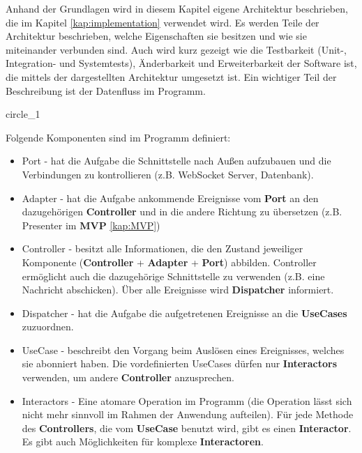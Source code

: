 Anhand der Grundlagen wird in diesem Kapitel eigene Architektur beschrieben, die im Kapitel \ref{kap:implementation} verwendet wird.
Es werden Teile der Architektur beschrieben, welche Eigenschaften sie besitzen und wie sie miteinander verbunden sind.
Auch wird kurz gezeigt wie die Testbarkeit (Unit-, Integration- und Systemtests), 
Änderbarkeit und Erweiterbarkeit der Software ist, die mittels der dargestellten Architektur umgesetzt ist.    
Ein wichtiger Teil der Beschreibung ist der Datenfluss im Programm.

{circle_1}

Folgende Komponenten sind im Programm definiert:
\begin{itemize}
    \item Port - hat die Aufgabe die Schnittstelle nach Außen aufzubauen und die Verbindungen zu kontrollieren (z.B. WebSocket Server, Datenbank).
    \item Adapter  - hat die Aufgabe ankommende Ereignisse vom \textbf{Port} an den dazugehörigen \textbf{Controller} 
    und in die andere Richtung zu übersetzen (z.B. Presenter im \textbf{MVP} \ref{kap:MVP})
    \item Controller - besitzt alle Informationen, die den Zustand jeweiliger Komponente (\textbf{Controller} + \textbf{Adapter} + \textbf{Port}) abbilden.
    Controller ermöglicht auch die dazugehörige Schnittstelle zu verwenden (z.B. eine Nachricht abschicken).
    Über alle Ereignisse wird \textbf{Dispatcher} informiert.
    \item Dispatcher - hat die Aufgabe die aufgetretenen Ereignisse an die \textbf{UseCases} zuzuordnen.
    \item UseCase - beschreibt den Vorgang beim Auslösen eines Ereignisses, welches sie abonniert haben. Die
    vordefinierten UseCases dürfen nur \textbf{Interactors} verwenden, um andere \textbf{Controller} anzusprechen.
    \item Interactors - Eine atomare Operation im Programm (die Operation lässt sich nicht mehr sinnvoll im Rahmen
    der Anwendung aufteilen). Für jede Methode des \textbf{Controllers}, 
    die vom \textbf{UseCase} benutzt wird, gibt es einen \textbf{Interactor}. Es gibt auch Möglichkeiten für komplexe \textbf{Interactoren}.
\end{itemize}
